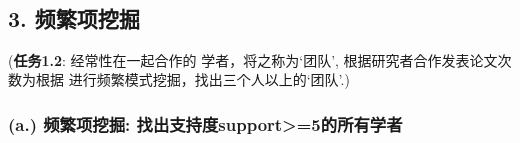 \documentclass[11pt]{article}
\begin{document}
    \begin{center}
    \end{center}
    { \hspace*{\fill} \\}
    
    \subsection{3. 频繁项挖掘}\label{ux9891ux7e41ux9879ux6316ux6398}

(\textbf{任务1.2}: 经常性在一起合作的 学者，将之称为`团队',
根据研究者合作发表论文次数为根据
进行频繁模式挖掘，找出三个人以上的`团队'.)

    \subsubsection{(a.) 频繁项挖掘:
找出支持度support\textgreater{}=5的所有学者}\label{a.-ux9891ux7e41ux9879ux6316ux6398-ux627eux51faux652fux6301ux5ea6support5ux7684ux6240ux6709ux5b66ux8005}
\end{document}
